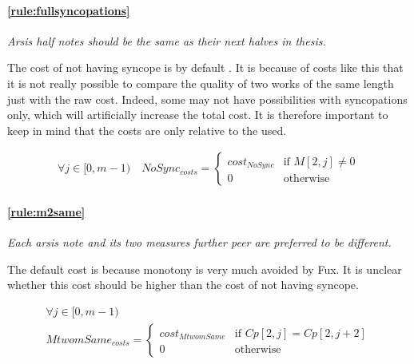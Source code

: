 \paragraph{\ref{rule:fullsyncopations}} \textit{Arsis half notes should be the same as their next halves in thesis.}

The cost of not having syncope is by default . It is because of costs like this that it is not really possible to compare the quality of two works of the same length just with the raw cost. Indeed, some \cf may not have possibilities with syncopations only, which will artificially increase the total cost. It is therefore important to keep in mind that the costs are only relative to the \cf used.

\begin{equation}
    \begin{gathered}
        \forall j \in [0, m-1) \quad
        NoSync_{costs} = \begin{cases}
            cost_{NoSync} & \text{if } M[2, j] \neq 0\\
            0 & \text{otherwise}
        \end{cases}
    \end{gathered}
\end{equation}

\paragraph{\ref{rule:m2same}} \textit{Each arsis note and its two measures further peer are preferred to be different.}

The default cost is  because monotony is very much avoided by Fux. It is unclear whether this cost should be higher than the cost of not having syncope.

\begin{equation}
    \begin{gathered}
        \forall j \in [0, m-1)\\
        MtwomSame_{costs} = \begin{cases}
            cost_{MtwomSame} & \text{if } Cp[2, j] = Cp[2, j+2]\\
            0 & \text{otherwise}
        \end{cases}
    \end{gathered}
\end{equation}
